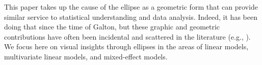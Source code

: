 This paper  takes up  the cause  of the  ellipse as  a geometric  form that  can
provide similar service to statistical understanding and data analysis.  Indeed,
it has been doing that since the time of Galton, but these graphic and geometric
contributions have often  been incidental and  scattered in the  literature
(e.g., \citet{Bryant:1984,CampbellAtchley:81,SavilleWood:1986,Wickens:1995}). 
We
focus here on visual  insights through ellipses in  the areas of linear  models,
multivariate linear models, and mixed-effect models.

